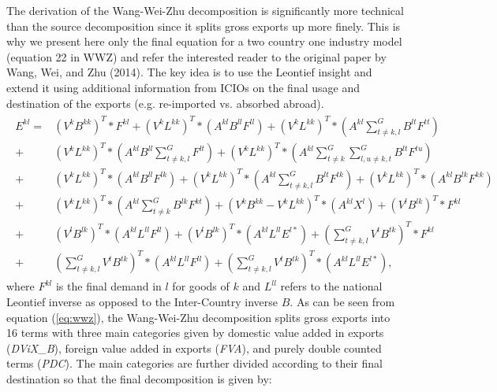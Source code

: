 \documentclass{article}\usepackage[]{graphicx}\usepackage[]{color}
\begin{document}
The derivation of the Wang-Wei-Zhu decomposition is significantly more technical than the source decomposition since it splits gross exports up more finely. This is why we present here only the final equation for a two country one industry model (equation 22 in WWZ) and refer the interested reader to the original paper by Wang, Wei, and Zhu (2014). The key idea is to use the Leontief insight and extend it using additional information from ICIOs on the final usage and destination of the exports (e.g. re-imported vs. absorbed abroad).
\begin{align}
\label{eq:wwz}
\begin{split}
E^{kl}
= &\left(V^k B^{kk} \right)^T * F^{kl} 
+ \left(V^k L^{kk} \right)^T * \left(A^{kl} B^{ll} F^{ll} \right)
+  \left(V^k L^{kk} \right)^T * (A^{kl} \sum_{t \neq k,l}^G  B^{lt} F^{tt} )\\
+& \left(V^k L^{kk} \right)^T *  (A^{kl} B^{ll} \sum_{t \neq k,l}^G  F^{lt} ) 
+  \left(V^k L^{kk} \right)^T * (A^{kl} \sum_{t \neq k}^G \sum_{l,u \neq k,t}^G B^{lt} F^{tu} ) \\
+& \left(V^k L^{kk} \right)^T * \left(A^{kl} B^{ll} F^{lk} \right)
+ \left(V^k L^{kk} \right)^T * (A^{kl} \sum_{t \neq k,l}^G  B^{lt} F^{tk} )
+ \left(V^k L^{kk} \right)^T * \left(A^{kl} B^{lk} F^{kk} \right) \\
+& \left(V^k L^{kk} \right)^T * (A^{kl} \sum_{t \neq k}^G  B^{lk} F^{kt} )
+ \left(V^k B^{kk} -  V^k L^{kk} \right)^T * \left(A^{kl} X^{l}  \right)
+ \left(V^l B^{lk} \right)^T * F^{kl} \\
+& \left(V^l B^{lk} \right)^T *  \left(A^{kl} L^{ll} F^{ll} \right)
+ \left(V^l B^{lk} \right)^T *  \left(A^{kl} L^{ll} E^{l*} \right)
+ (\sum_{t \neq k,l}^G  V^{t} B^{tk} )^{T} * F^{kl} \\
+& (\sum_{t \neq k,l}^G  V^{t} B^{tk} )^{T} *  \left(A^{kl} L^{ll} F^{ll} \right)
+ (\sum_{t \neq k,l}^G  V^{t} B^{tk} )^{T} *  \left(A^{kl} L^{ll} E^{l*} \right) ,
\end{split}
\end{align}
where $F^{kl}$ is the final demand in $l$ for goods of $k$ and $L^{ll}$ refers to the national Leontief inverse as opposed to the Inter-Country inverse $B$. As can be seen from equation (\ref{eq:wwz}), the Wang-Wei-Zhu decomposition splits gross exports into 16 terms with three main categories given by domestic value added in exports (\textit{DViX\_B}), foreign value added in exports (\textit{FVA}), and purely double counted terms (\textit{PDC}). The main categories are further divided according to their final destination so that the final decomposition is given by:
\end{document}
